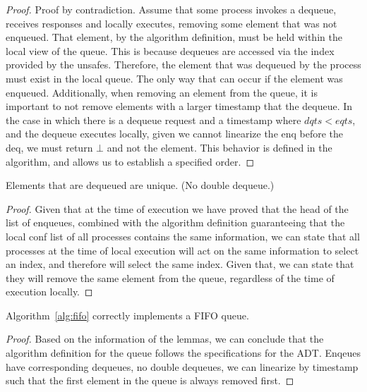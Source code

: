 \documentclass[a4paper,anonymous,USenglish]{lipics-v2021} %
\theoremstyle{definition}
\begin{document}
\begin{proof}
Proof by contradiction. Assume that some process invokes a dequeue, receives responses and locally executes, removing some element that was not enqueued.  That element, by the algorithm definition, must be held within the local view of the queue. This is because dequeues are accessed via the index provided by the unsafes. Therefore, the element that was dequeued by the process must exist in the local queue. The only way that can occur if the element was enqueued.  Additionally, when removing an element from the queue, it is important to not remove elements with a larger timestamp that the dequeue. In the case in which there is a dequeue request and a timestamp where $dqts < eqts$, and the dequeue executes locally, given we cannot linearize the enq before the deq, we must return $\bot$ and not the element. This behavior is defined in the algorithm, and allows us to establish a specified order.
\end{proof}

\begin{lemma}
Elements that are dequeued are unique. (No double dequeue.)
\end{lemma}

\begin{proof}
Given that at the time of execution we have proved that the head of the list of enqueues, combined with the algorithm definition guaranteeing that the local conf list of all processes contains the same information, we can state that all processes at the time of local execution will act on the same information to select an index, and therefore will select the same index. Given that, we can state that they will remove the same element from the queue, regardless of the time of execution locally.
\end{proof}

\begin{theorem}
  Algorithm~\ref{alg:fifo} correctly implements a FIFO queue.
\end{theorem}

\begin{proof}
Based on the information of the lemmas, we can conclude that the algorithm definition for the queue follows the specifications for the ADT. Enqeues have corresponding dequeues, no double dequeues, we can linearize by timestamp such that the first element in the queue is always removed first.
\end{proof}

  
\end{document}
